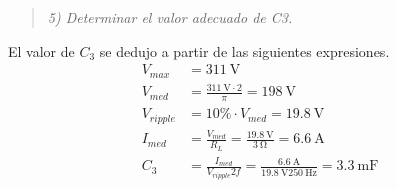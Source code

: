 \begin{quote} \textit{5) Determinar el valor adecuado de C3.}
\end{quote}
 El valor de $C_3$ se dedujo a partir de las siguientes expresiones.
\begin{align}
	V_{max}  &=\SI{311}{\volt} \\
	V_{med}  & = \frac{\SI{311}{\volt}\cdot 2}{\pi} = \SI{198}{\volt} \\
	V_{ripple} &= 10\% \cdot V_{med} = \SI{19.8}{\volt}\\
	I_{med} &= \frac{V_{med}}{R_L} = \frac{\SI{19.8}{\volt}}{\SI{3}{\ohm}} = \SI{6.6}{\ampere} \\
	C_3 &= \frac{I_{med}}{V_{ripple}2f} = \frac{\SI{6.6}{\ampere}}{\SI{19.8}{\volt}2 \SI{50}{\hertz}} = \boxed{\SI{3.3}{\milli\farad}} \\
\end{align}


